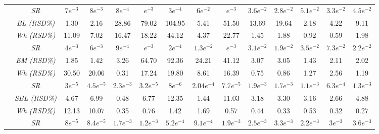 \begin{table*}[h]
{\begin{tabular}{!{\vrule width 1.2pt}>{\centering\arraybackslash}p{2cm}|c!{\vrule width 1.2pt}c|c|c|c|c|c!{\vrule width 1.2pt}c|c|c|c|c|c!{\vrule width 1.2pt}}
& \textit{SR} & \(7e^{-3}\) & \(8e^{-3}\) & \(8e^{-4}\) & \(e^{-3}\) & \(3e^{-4}\) & \(6e^{-2}\) & \(e^{-3}\) & \(3.6e^{-2}\) & \(2.8e^{-2}\) & \(5.1e^{-2}\) & \(3.3e^{-2}\) & \(4.5e^{-2}\) \\
 & \textit{BL (RSD\%)} & 1.30 & 2.16 & 28.86 & 79.02 & 104.95 & 5.41 & 51.50 & 13.69 & 19.64 & 2.18 & 4.22 & 9.11 \\
& \textit{Wh (RSD\%)} & 11.09 & 7.02 & 16.47 & 18.22 & 44.12 & 4.37 & 22.77 & 1.45 & 1.88 & 0.92 & 0.59 & 1.98 \\
& \textit{SR} & \(4e^{-3}\) & \(6e^{-3}\) & \(9e^{-4}\) & \(e^{-3}\) & \(2e^{-4}\) & \(1.3e^{-2}\) & \(e^{-3}\) & \(3.1e^{-2}\) & \(1.9e^{-2}\) & \(3.5e^{-2}\) & \(7.3e^{-2}\) & \(2.2e^{-2}\) \\
 & \textit{EM (RSD\%)} & 1.85 & 1.42 & 3.26 & 64.70 & 92.36 & 24.21 & 41.12 & 3.07 & 3.05 & 1.43 & 2.11 & 2.02 \\
& \textit{Wh (RSD\%)} & 30.50 & 20.06 & 0.31 & 17.24 & 19.80 & 8.61 & 16.39 & 0.75 & 0.86 & 1.27 & 2.56 & 1.19 \\
& \textit{SR} & \(3e^{-5}\) & \(4.5e^{-5}\) & \(2.3e^{-3}\) & \(3.2e^{-5}\) & \(8e^{-6}\) & \(2.04e^{-4}\) & \(7.7e^{-5}\) & \(1.9e^{-3}\) & \(1.7e^{-3}\) & \(1.1e^{-3}\) & \(6.3e^{-4}\) & \(1.3e^{-3}\) \\
 & \textit{SBL (RSD\%)} & 4.67 & 6.99 & 0.48 & 6.77 & 12.35 & 1.44 & 11.03 & 3.18 & 3.30 & 3.16 & 2.66 & 4.88 \\
& \textit{Wh (RSD\%)} & 12.13 & 10.07 & 0.35 & 0.76 & 1.42 & 1.69 & 0.57 & 0.44 & 0.33 & 0.53 & 0.32 & 0.27 \\
& \textit{SR} & \(8e^{-5}\) & \(8.4e^{-5}\) & \(1.7e^{-3}\) & \(1.2e^{-3}\) & \(5.2e^{-4}\) & \(9.1e^{-4}\) & \(1.9e^{-3}\) & \(2.5e^{-3}\) & \(3.3e^{-3}\) & \(2.2e^{-3}\) & \(3e^{-3}\) & \(3.6e^{-3}\) \\

\end{tabular}}
\end{table*}
